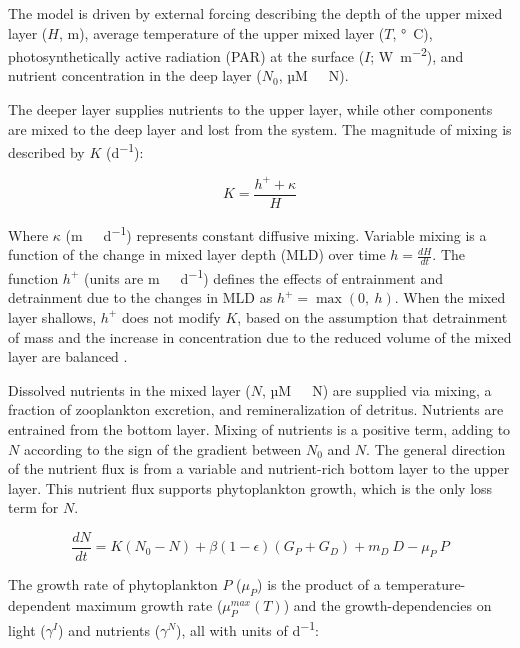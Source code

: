\documentclass[journal abbreviation, manuscript]{copernicus}
\begin{document}
The model is driven by external forcing describing the depth of the upper mixed layer ($H$, \unit{m}), average temperature of the upper mixed layer ($T$, \unit{\degree C}), photosynthetically active radiation (PAR) at the surface ($I$; \unit{W m^{-2}}), and nutrient concentration in the deep layer ($N_0$, \unit{µM \ N}). 

The deeper layer supplies nutrients to the upper layer, while other components are mixed to the deep layer and lost from the system. The magnitude of mixing is described by $K$ (\unit{d^{−1}}):

\begin{equation}
    K = \frac{h^{+} + \kappa}{H}
\end{equation}

Where $\kappa$ (\unit{m \ d^{−1}}) represents constant diffusive mixing. Variable mixing is a function of the change in mixed layer depth (MLD) over time $h = \frac{dH}{dt}$. The function $h^{+}$ (units are \unit{m \ d^{−1}}) defines the effects of entrainment and detrainment due to the changes in MLD as $h^{+} = \max(0, \ h)$. When the mixed layer shallows, $h^{+}$ does not modify $K$, based on the assumption that detrainment of mass and the increase in concentration due to the reduced volume of the mixed layer are balanced \citep{Evans1985ACycles}. 

Dissolved nutrients in the mixed layer ($N$, \unit{µM \ N}) are supplied via mixing, a fraction of zooplankton excretion, and remineralization of detritus. Nutrients are entrained from the bottom layer. Mixing of nutrients is a positive term, adding to $N$ according to the sign of the gradient between $N_0$ and $N$. The general direction of the nutrient flux is from a variable and nutrient-rich bottom layer to the upper layer. This nutrient flux supports phytoplankton growth, which is the only loss term for $N$.

\begin{equation}
    \frac{d N}{d t} = 
    K (N_0 - N) %
    + \beta(1 - \epsilon)(G_P + G_D) %
    + m_D \ D %
    - \mu_{P} \ P %
\end{equation}

The growth rate of phytoplankton $P$ ($\mu_{P}$) is the product of a temperature-dependent maximum growth rate ($\mu_P^{max}(T)$) and the growth-dependencies on light ($\gamma^{I}$) and nutrients ($\gamma^{N}$), all with units of \unit{d^{−1}}: 
\end{document}
